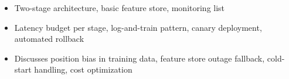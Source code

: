 \begin{interviewq}
\goodgreat
\begin{itemize}
    \item {} Two-stage architecture, basic feature store, monitoring list
    \item {} Latency budget per stage, log-and-train pattern, canary deployment, automated rollback
    \item {} Discusses position bias in training data, feature store outage fallback, cold-start handling, cost optimization
\end{itemize}

\end{interviewq}

